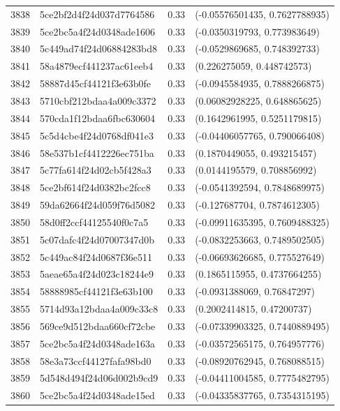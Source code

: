 \begin{table}[ht]
\begin{tabular}{rlrl}
  3838 & 5ce2bf2d4f24d037d7764586 & 0.33 & (-0.05576501435, 0.7627788935) \\ 
  3839 & 5ce2bc5a4f24d0348ade1606 & 0.33 & (-0.0350319793, 0.773983649) \\ 
  3840 & 5c449ad74f24d06884283bd8 & 0.33 & (-0.0529869685, 0.748392733) \\ 
  3841 & 58a4879ecf441237ac61eeb4 & 0.33 & (0.226275059, 0.448742573) \\ 
  3842 & 58887d45cf44121f3e63b0fe & 0.33 & (-0.0945584935, 0.7888266875) \\ 
  3843 & 5710cbf212bdaa4a009c3372 & 0.33 & (0.06082928225, 0.648865625) \\ 
  3844 & 570cda1f12bdaa6fbc630604 & 0.33 & (0.1642961995, 0.5251179815) \\ 
  3845 & 5c5d4cbe4f24d0768df041e3 & 0.33 & (-0.04406057765, 0.790066408) \\ 
  3846 & 58e537b1cf4412226ec751ba & 0.33 & (0.1870449055, 0.493215457) \\ 
  3847 & 5c77fa614f24d02cb5f428a3 & 0.33 & (0.0144195579, 0.708856992) \\ 
  3848 & 5ce2bf614f24d0382bc2fcc8 & 0.33 & (-0.0541392594, 0.7848689975) \\ 
  3849 & 59da62664f24d059f76d5082 & 0.33 & (-0.127687704, 0.7874612305) \\ 
  3850 & 58d0ff2ccf44125540f0c7a5 & 0.33 & (-0.09911635395, 0.7609488325) \\ 
  3851 & 5c07dafc4f24d07007347d0b & 0.33 & (-0.0832253663, 0.7489502505) \\ 
  3852 & 5c449ac84f24d0687f36e511 & 0.33 & (-0.06693626685, 0.775527649) \\ 
  3853 & 5aeae65a4f24d023c18244e9 & 0.33 & (0.1865115955, 0.4737664255) \\ 
  3854 & 58888985cf44121f3e63b100 & 0.33 & (-0.0931388069, 0.76847297) \\ 
  3855 & 5714d93a12bdaa4a009c33c8 & 0.33 & (0.2002414815, 0.47200737) \\ 
  3856 & 569ce9d512bdaa660cf72cbe & 0.33 & (-0.07339903325, 0.7440889495) \\ 
  3857 & 5ce2bc5a4f24d0348ade163a & 0.33 & (-0.03572565175, 0.764957776) \\ 
  3858 & 58e3a73ccf44127fafa98bd0 & 0.33 & (-0.08920762945, 0.768088515) \\ 
  3859 & 5d548d494f24d06d002b9cd9 & 0.33 & (-0.04411004585, 0.7775482795) \\ 
  3860 & 5ce2bc5a4f24d0348ade15ed & 0.33 & (-0.04335837765, 0.7354315195) \\ 

\end{tabular}
\end{table}
